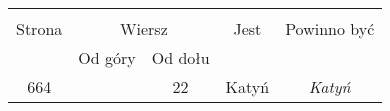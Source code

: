 \documentclass[a4paper,11pt]{article}
\begin{document}
\begin{center}
  \begin{tabular}{|c|c|c|c|c|}
    \hline
    & \multicolumn{2}{c|}{} & & \\
    Strona & \multicolumn{2}{c|}{Wiersz}& Jest & Powinno być \\ \cline{2-3}
    & Od góry & Od dołu &  &  \\ \hline
    664 & & 22 & Katyń & \emph{Katyń} \\
    \hline
  \end{tabular}
\end{center}





 {}




\end{document}
